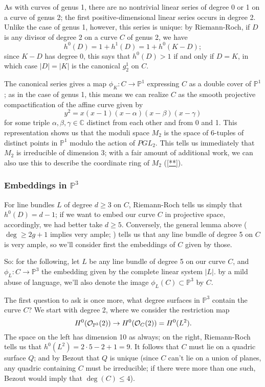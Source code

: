 \documentclass[12pt, leqno]{article}
\def\CC{{\mathbb C}}
\def\PP{{\mathbb P}}
\def\cO{{\cal O}}
\begin{document}
As with curves of genus 1, there are no nontrivial linear series of degree 0 or 1 on a curve of genus 2; the first positive-dimensional linear series occurs in degree 2. Unlike the case of genus 1, however, this series is unique: by Riemann-Roch, if $D$ is any divisor of degree 2 on a curve $C$ of genus 2, we have
$$
h^0(D) = 1 + h^1(D) = 1 + h^0(K-D);
$$
since $K-D$ has degree 0, this says that $h^0(D) > 1$ if and only if $D=K$, in which case $|D| = |K|$ is the canonical $g^1_2$ on $C$.

The canonical series gives a map $\phi_K : C \to \PP^1$ expressing $C$ as a double cover of $\PP^1$; as in the case of genus 1, this means we can realize $C$ as the smooth projective compactification of the affine curve given by
$$
y^2 = x(x-1)(x - \alpha)(x - \beta)(x - \gamma)
$$
for some triple $\alpha,\beta,\gamma \in \CC$ distinct from each other and from 0 and 1. This representation shows us that the moduli space $M_2$ is the space of 6-tuples of distinct points in $\PP^1$ modulo the action of $PGL_2$. This tells us immediately that $M_2$ is irreducible of dimension 3; with a fair amount of additional work, we can also use this to describe the coordinate ring of $M_2$ (\ref{**}).

\subsubsection{Embeddings in $\PP^3$}

For line bundles $L$ of degree $d \geq 3$ on $C$, Riemann-Roch tells us simply that $h^0(D) = d - 1$; if we want to embed our curve $C$ in projective space, accordingly, we had better take $d \geq 5$. Conversely, the general lemma above ($\deg \geq 2g+1$ implies very ample; \cite{**}) tells us that any line bundle of degree 5 on $C$ is very ample, so we'll consider first the embeddings of $C$ given by those.

So: for the following, let $L$ be any line bundle of degree 5 on our curve $C$, and $\phi_L : C \to \PP^3$ the embedding given by the complete linear system $|L|$. by a mild abuse of language, we'll also denote the image $\phi_L(C) \subset \PP^3$ by $C$.

The first question to ask is once more, what degree surfaces in $\PP^3$ contain the curve $C$? We start with degree 2, where we consider the restriction map
$$
H^0(\cO_{\PP^3}(2)) \to H^0(\cO_C(2)) = H^0(L^2).
$$
The space on the left has dimension 10 as always; on the right, Riemann-Roch tells us that $h^0(L^2) = 2\cdot5 - 2 + 1 = 9$. It follows that $C$ must lie on a quadric surface $Q$; and by Bezout that $Q$ is unique (since $C$ can't lie on a union of planes, any quadric containing $C$ must be irreducible; if there were more than one such, Bezout would imply that $\deg(C) \leq 4$).
\end{document}
